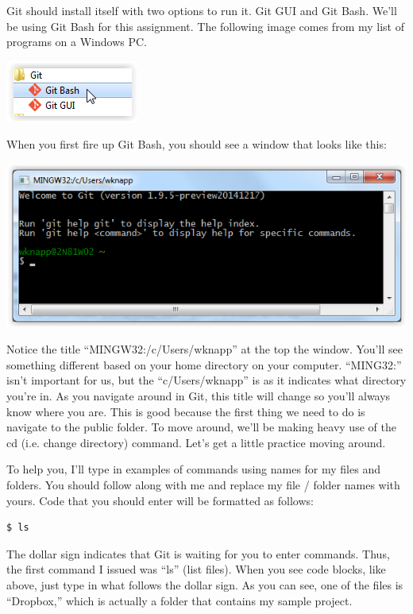 \documentclass[12pt]{article}
\begin{document}
Git should install itself with two options to run it. Git GUI and Git Bash. We'll be using
Git Bash for this assignment. The following image comes from my list of programs on a
Windows PC.

\includegraphics{imgs/Git01.PNG}

When you first fire up Git Bash, you should see a window that looks like this:

\includegraphics{imgs/Git02.PNG}

Notice the title ``MINGW32:/c/Users/wknapp'' at the top the window. You'll see something
different based on your home directory on your computer. ``MING32:''
isn't important for us, but the ``c/Users/wknapp'' is as it indicates what
directory you're in. As you navigate around in Git, this title will change so you'll
always know where you are. This is good because the first thing we need to do is
navigate to the public folder. To move around, we'll be making heavy use of the cd
(i.e. change directory) command. Let's get a little practice moving around.

To help you, I'll type in examples of commands using names for my files and folders.
You should follow along with me and replace my file / folder names with yours. Code
that you should enter will be formatted as follows:

\begin{verbatim}
$ ls
\end{verbatim}

The dollar sign indicates that Git is waiting for you to enter commands. Thus, the 
first command I issued was ``ls'' (list files). When you see code blocks, like
above, just type in what follows the dollar sign. As you can see, one of the files is
``Dropbox,'' which is actually a folder that contains my sample project.
\end{document}
